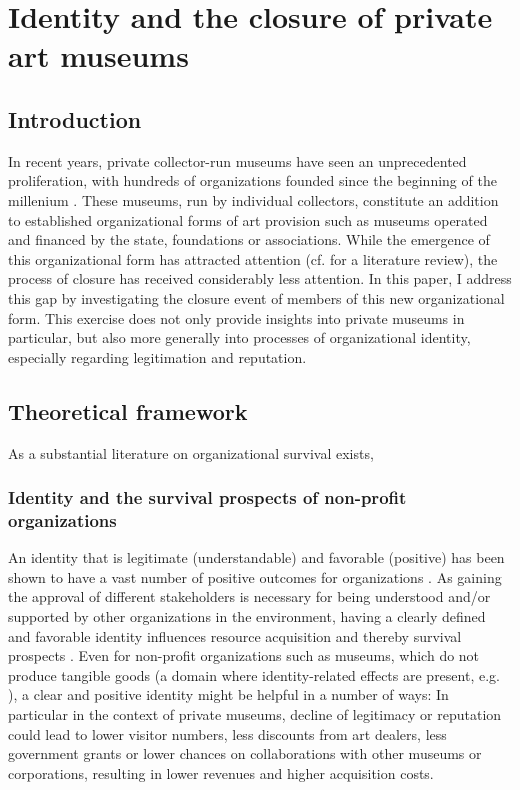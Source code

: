 \documentclass[12pt]{article}
\author{Johannes Aengenheyster}
\date{\today}
\title{}
\begin{document}
\section*{Identity and the closure of private art museums}
\label{sec:org16a7685}


\subsection*{Introduction}
\label{sec:orgef6a080}

In recent years, private collector-run museums have seen an unprecedented proliferation, with hundreds of organizations founded since the beginning of the millenium \parencite{Velthuis_etal_2023_boom,LarrysList_2015_report}.
These museums, run by individual collectors, constitute an addition to established organizational forms of art provision such as museums operated and financed by the state, foundations or associations.
While the emergence of this organizational form has attracted attention (cf. \cite{Kolbe_etal_2022_privatemuseum} for a literature review), the process of closure has received considerably less attention.
In this paper, I address this gap by investigating the closure event of members of this new organizational form.
This exercise does not only provide insights into private museums in particular, but also more generally into processes of organizational identity, especially regarding legitimation and reputation. 



\subsection*{Theoretical framework}
\label{sec:org90170ed}

As a substantial literature on organizational survival exists, 


\subsubsection*{Identity and the survival prospects of non-profit organizations}
\label{sec:org8725d02}
An identity that is legitimate (understandable) and favorable (positive) has been shown to have a vast number of positive outcomes for organizations \parencite{Lange_Lee_Dai_2010_reputation}.
As gaining the approval of different stakeholders is necessary for being understood and/or supported by other organizations in the environment, having a clearly defined and favorable identity influences resource acquisition and thereby survival prospects \parencite{Rao_1994_reputation}.
Even for non-profit organizations such as museums, which do not produce tangible goods (a domain where identity-related effects are present, e.g. \cite{Hsu_2015_granted,Bogaert_etal_2014_ecological}), a clear and positive identity might be helpful in a number of ways:
In particular in the context of private museums, decline of legitimacy or reputation could lead to lower visitor numbers, less discounts from art dealers, less government grants or lower chances on collaborations with other museums or corporations, resulting in lower revenues and higher acquisition costs.
\end{document}
